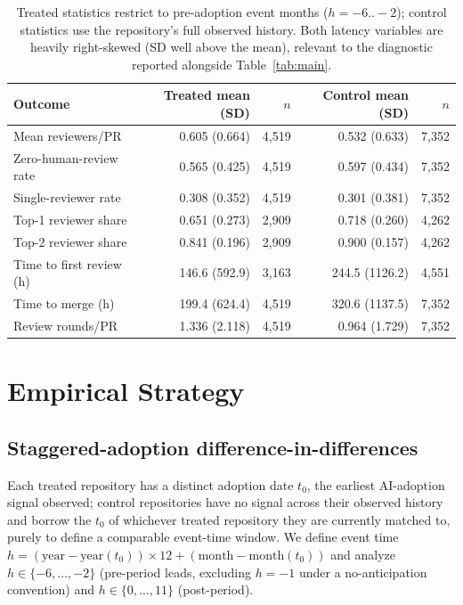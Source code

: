 \documentclass[12pt]{article}
\begin{document}
\begin{table}[htbp]
\centering
\caption{Descriptive statistics, pre-adoption period (treated) vs.\ full history (control)}
\label{tab:descriptives}
\small
\begin{tabular}{lrrrr}
\toprule
Outcome & Treated mean (SD) & $n$ & Control mean (SD) & $n$ \\
\midrule
Mean reviewers/PR         & 0.605 (0.664) & 4{,}519 & 0.532 (0.633) & 7{,}352 \\
Zero-human-review rate    & 0.565 (0.425) & 4{,}519 & 0.597 (0.434) & 7{,}352 \\
Single-reviewer rate      & 0.308 (0.352) & 4{,}519 & 0.301 (0.381) & 7{,}352 \\
Top-1 reviewer share      & 0.651 (0.273) & 2{,}909 & 0.718 (0.260) & 4{,}262 \\
Top-2 reviewer share      & 0.841 (0.196) & 2{,}909 & 0.900 (0.157) & 4{,}262 \\
Time to first review (h)  & 146.6 (592.9) & 3{,}163 & 244.5 (1126.2) & 4{,}551 \\
Time to merge (h)         & 199.4 (624.4) & 4{,}519 & 320.6 (1137.5) & 7{,}352 \\
Review rounds/PR          & 1.336 (2.118) & 4{,}519 & 0.964 (1.729) & 7{,}352 \\
\bottomrule
\end{tabular}
\caption*{\footnotesize Treated statistics restrict to pre-adoption event
months ($h=-6..-2$); control statistics use the repository's full observed
history. Both latency variables are heavily right-skewed (SD well above
the mean), relevant to the diagnostic reported alongside Table~\ref{tab:main}.}
\end{table}

\section{Empirical Strategy}

\subsection{Staggered-adoption difference-in-differences}

Each treated repository has a distinct adoption date $t_0$, the earliest
AI-adoption signal observed; control repositories have no signal across
their observed history and borrow the $t_0$ of whichever treated
repository they are currently matched to, purely to define a comparable
event-time window. We define event time
$h = (\text{year}-\text{year}(t_0))\times12 + (\text{month}-\text{month}(t_0))$
and analyze $h\in\{-6,\dots,-2\}$ (pre-period leads, excluding $h=-1$ under
a no-anticipation convention) and $h\in\{0,\dots,11\}$ (post-period).
\end{document}
